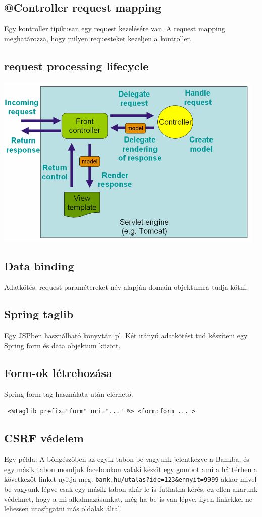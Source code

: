 \documentclass[a4paper,14pt]{extarticle}
\def\code#1{
	\begin{alltt}
	\texttt{#1}
	\end{alltt}
}
\begin{document}
		\subsection{@Controller request mapping}
			Egy kontroller tipikusan egy request kezelésére van.
			A request mapping meghatározza, hogy milyen requesteket kezeljen a kontroller.
		\subsection{request processing lifecycle}
		\begin{center}
			\includegraphics[width=13cm]{req}
		\end{center}
		\subsection{Data binding}
		Adatkötés. request paramétereket név alapján domain objektumra tudja kötni. 
		\subsection{Spring taglib}
		Egy JSPben használható könyvtár. pl. Két irányú adatkötést tud készíteni egy Spring form és data objektum között. 
		\subsection{Form-ok létrehozása}
		Spring form tag használata után elérhető. 
		\code{%
			<\%\@ taglib prefix="form" uri="..." \%>
			\newline
			<form:form ... >
		}
		\subsection{CSRF védelem}
		Egy példa:\newline
		A böngészőben az egyik tabon be vagyunk jelentkezve a Bankba, és egy másik tabon mondjuk facebookon valaki készit egy gombot ami a háttérben a következőt linket nyitja meg: 
		\verb|bank.hu/utalas?ide=123&ennyit=9999| akkor mivel be vagyunk lépve csak egy másik tabon akár le is futhatna kérés, ez ellen akarunk védelmet, hogy a mi alkalmazásunkat, még ha be is van lépve, ilyen linkekkel ne lehessen utasítgatni más oldalak által.  
\end{document}
